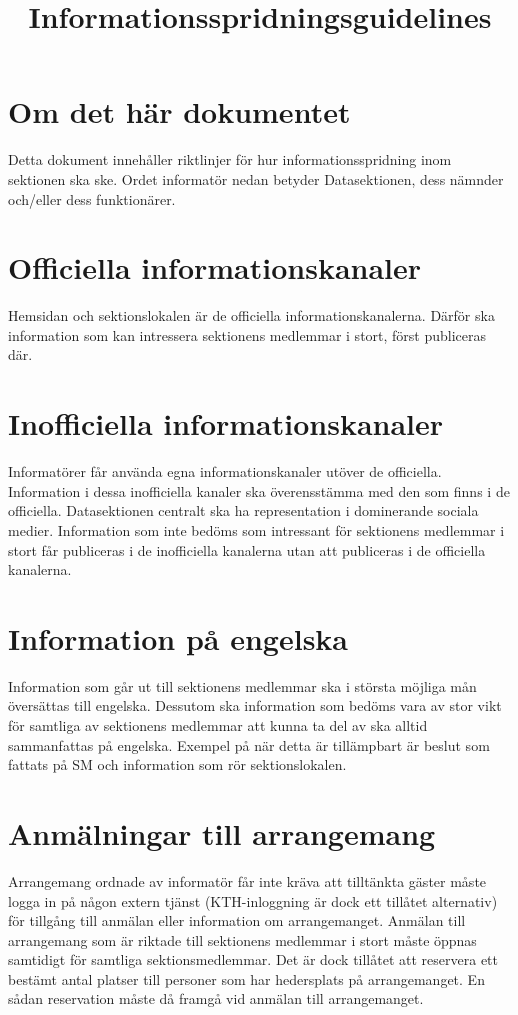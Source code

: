 \documentclass{dgovdoc}
\title{Informationsspridningsguidelines}
\begin{document}
\maketitle

\section{Om det här dokumentet}
Detta dokument innehåller riktlinjer för hur informationsspridning inom sektionen ska ske. Ordet informatör nedan betyder Datasektionen, dess nämnder och/eller dess funktionärer.

\section{Officiella informationskanaler}
Hemsidan och sektionslokalen är de officiella informationskanalerna. Därför ska information som kan intressera sektionens medlemmar i stort, först publiceras där.

\section{Inofficiella informationskanaler}
Informatörer får använda egna informationskanaler utöver de officiella. Information i dessa inofficiella kanaler ska överensstämma med den som finns i de officiella. Datasektionen centralt ska ha representation i dominerande sociala medier. Information som inte bedöms som intressant för sektionens medlemmar i stort får publiceras i de inofficiella kanalerna utan att publiceras i de officiella kanalerna.

\section{Information på engelska}
Information som går ut till sektionens medlemmar ska i största möjliga mån översättas till engelska. Dessutom ska information som bedöms vara av stor vikt för samtliga av sektionens medlemmar att kunna ta del av ska alltid sammanfattas på engelska. Exempel på när detta är tillämpbart är beslut som fattats på SM och information som rör sektionslokalen.

\section{Anmälningar till arrangemang}
Arrangemang ordnade av informatör får inte kräva att tilltänkta gäster måste logga in på någon extern tjänst (KTH-inloggning är dock ett tillåtet alternativ) för tillgång till anmälan eller information om arrangemanget. Anmälan till arrangemang som är riktade till sektionens medlemmar i stort måste öppnas samtidigt för samtliga sektionsmedlemmar. Det är dock tillåtet att reservera ett bestämt antal platser till personer som har hedersplats på arrangemanget. En sådan reservation måste då framgå vid anmälan till arrangemanget.
\end{document}
